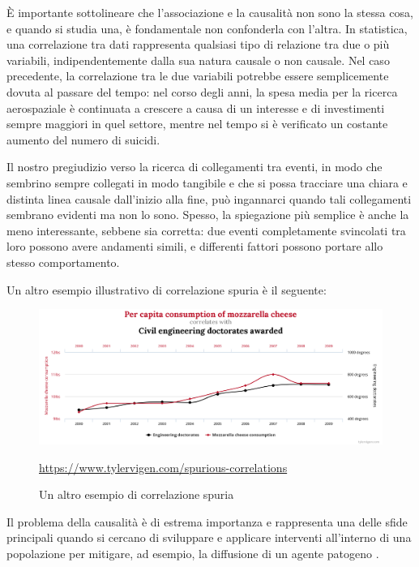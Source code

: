 È importante sottolineare che l'associazione e la causalità non sono 
la stessa cosa, e quando si studia una, è fondamentale non confonderla 
con l'altra. In statistica, una correlazione tra dati rappresenta 
qualsiasi tipo di relazione tra due o più variabili, indipendentemente 
dalla sua natura causale o non causale. Nel caso precedente, 
la correlazione tra le due variabili potrebbe essere semplicemente 
dovuta al passare del tempo: nel corso degli anni, la spesa media per 
la ricerca aerospaziale è continuata a crescere a causa di un interesse 
e di investimenti sempre maggiori in quel settore, mentre nel tempo 
si è verificato un costante aumento del numero di suicidi.

Il nostro pregiudizio verso la ricerca di collegamenti tra eventi, 
in modo che sembrino sempre collegati in modo tangibile e che si 
possa tracciare una chiara e distinta linea causale dall'inizio alla 
fine, può ingannarci quando tali collegamenti sembrano evidenti ma 
non lo sono. Spesso, la spiegazione più semplice è anche la meno 
interessante, sebbene sia corretta: due eventi completamente svincolati 
tra loro possono avere andamenti simili, e differenti fattori possono 
portare allo stesso comportamento. 

Un altro esempio illustrativo di correlazione spuria è il seguente:

\begin{figure}[H]
    \begin{center}
        \includegraphics[width=\linewidth]{img/chart1.png}
        \caption{Un altro esempio di correlazione spuria}
        \url{https://www.tylervigen.com/spurious-correlations}
        \label{fig:another_spurious_relations}
    \end{center}
\end{figure}

Il problema della causalità è di estrema importanza e rappresenta 
una delle sfide principali quando si cercano di sviluppare e 
applicare interventi all'interno di una popolazione per mitigare, 
ad esempio, la diffusione di un agente patogeno \cite{Parascandola2001-kw}.

